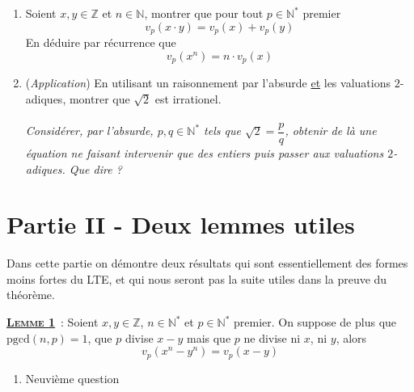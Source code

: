 \documentclass{article}
\newcommand{\N}{\mathbb{N}}
\newcommand{\Z}{\mathbb{Z}}
\begin{document}
\begin{enumerate}[label=(\arabic*)]
    \item Soient $x,y \in \Z$ et $n \in \N$, montrer que pour tout $p \in \N^*$ premier 
    $$v_p(x \cdot y) = v_p(x) + v_p(y)$$
    En déduire par récurrence que
    $$v_p(x^n) = n \cdot v_p(x)$$

    \vspace{0.2 cm}

    \item \thinspace (\textit{Application}) \thinspace En utilisant un raisonnement par l'absurde \underline{et} les valuations $2$-adiques, montrer que $\sqrt{2}$ est irrationel.\\
    \\
    \textit{Considérer, par l'absurde, $p,q \in \N^*$ tels que $\sqrt{2} = \dfrac{p}{q}$, obtenir de là une équation ne faisant intervenir que des entiers puis passer aux valuations $2$-adiques. Que dire ?}
\end{enumerate}

\newpage

\section*{Partie II - Deux lemmes utiles}
\vspace{0.3 cm}

\noindent Dans cette partie on démontre deux résultats qui sont essentiellement des formes moins fortes du LTE, et qui nous seront pas la suite utiles dans la preuve du théorème.

\begin{encadre}
  \underline{\textbf{\textsc{Lemme 1}}}~: Soient $x,y \in \Z$, $n \in \N^*$ et $p \in \N^*$ premier. On suppose de plus que $\text{pgcd}(n,p) = 1$, que $p$ divise $x - y$ mais que $p$ ne divise ni $x$, ni $y$, alors 
  $$v_p(x^n - y^n) = v_p(x-y)$$
\end{encadre}


\vspace{0.1 cm}

\begin{enumerate}[label=(\arabic*), start=9]
  \item Neuvième question
\end{enumerate}
\end{document}
